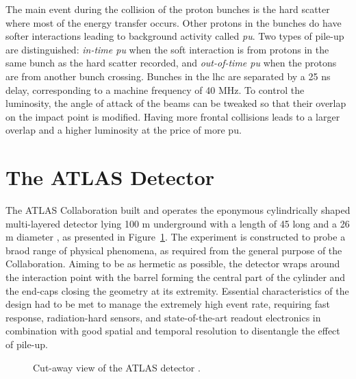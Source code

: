 The main event during the collision of the proton bunches is the hard scatter where most of the energy transfer occurs. Other protons in the bunches do have softer interactions leading to background activity called \textit{\gls{pu}}. Two types of pile-up are distinguished: \textit{in-time \gls{pu}} when the soft interaction is from protons in the same bunch as the hard scatter recorded, and \textit{out-of-time \gls{pu}} when the protons are from another bunch crossing. Bunches in the \gls{lhc} are separated by a 25 ns delay, corresponding to a machine frequency of 40 MHz. To control the luminosity, the angle of attack of the beams can be tweaked so that their overlap on the impact point is modified. Having more frontal collisions leads to a larger overlap and  a higher luminosity at the price of more \gls{pu}. 

\section{The ATLAS Detector}\label{sec-ATLASDet}
The ATLAS Collaboration built and operates the eponymous cylindrically shaped multi-layered detector lying 100 m underground with a length of 45 long and a 26 m diameter \cite{TheATLASCollaboration_2008}, as presented in Figure~\ref{fig-AtlasDec}. The experiment is constructed to probe a braod range of physical phenomena, as required from the general purpose of the Collaboration. Aiming to be as hermetic as possible, the detector wraps around the interaction point with the barrel forming the central part of the cylinder and the end-caps closing the geometry at its extremity. Essential characteristics of the design had to be met to manage the extremely high event rate, requiring fast response, radiation-hard sensors, and state-of-the-art readout electronics in combination with good spatial and temporal resolution to disentangle the effect of pile-up. 

\begin{figure}[!h]
\centering
\hspace{-1.25cm}
\caption{Cut-away view of the ATLAS detector \cite{ATLASschematics}.}
\label{fig-AtlasDec}
\end{figure}

